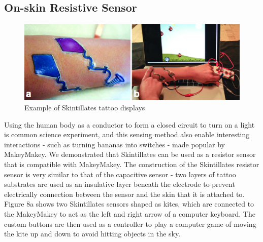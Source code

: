 \documentclass{sigchi}
\begin{document}
\subsection {On-skin Resistive Sensor}
\begin{figure}[!h]
\centering
\includegraphics[width=1\columnwidth]{figures/Figure8}
\caption{Example of Skintillates tattoo displays}
\label{fig:figure8}
\end{figure}
Using the human body as a conductor to form a closed circuit to turn on a light is common science experiment, and this sensing method also enable interesting interactions - such as turning bananas into switches - made popular by MakeyMakey. We demonstrated that Skintillates can be used as a resistor sensor that is compatible with MakeyMakey. The construction of the Skintillates resistor sensor is very similar to that of the capacitive sensor - two layers of tattoo substrates are used as an insulative layer beneath the electrode to prevent electrically connection between the sensor and the skin that it is attached to. Figure 8a shows two Skintillates sensors shaped as kites, which are connected to the MakeyMakey to act as the left and right arrow of a computer keyboard. The custom buttons are then used as a controller to play a computer game of moving the kite up and down to avoid hitting objects in the sky. 
\end{document}
